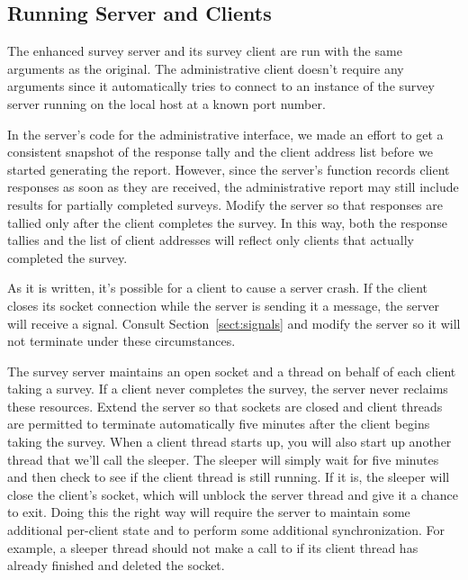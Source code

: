 
\subsection{Running Server and Clients}

The enhanced survey server and its survey client are run with the same
arguments as the original.  The administrative client doesn't require
any arguments since it automatically tries to connect to an instance
of the survey server running on the local host at a known port number.

\begin{exercises}

\item In the server's code for the administrative interface, we made
  an effort to get a consistent snapshot of the response tally and the
  client address list before we started generating the report.
  However, since the server's  function
  records client responses as soon as they are received, the
  administrative report may still include results for
  partially completed surveys.  Modify the server so that responses
  are tallied only after the client completes the survey.  In this
  way, both the response tallies and the list of client addresses will
  reflect only clients that actually completed the survey.

\item As it is written, it's possible for a client to cause a server
  crash.  If the client closes its socket connection while the server
  is sending it a message, the server will receive a 
  signal.  Consult Section~\ref{sect:signals} and modify the server so
  it will not terminate under these circumstances.

\item The survey server maintains an open socket and a thread on behalf
  of each client taking a survey.  If a client never completes the
  survey, the server never reclaims these resources.  Extend the
  server so that sockets are closed and client threads are permitted
  to terminate automatically five minutes after the client begins
  taking the survey.  When a client thread starts up, you will also
  start up another thread that we'll call the sleeper.  The sleeper
  will simply wait for five minutes and then check to see if the
  client thread is still running.  If it is, the sleeper will close
  the client's socket, which will unblock the server thread and give
  it a chance to exit.  Doing this the right way will require the server to
  maintain some additional per-client state and to perform
  some additional synchronization.  For example, a sleeper thread
  should not make a call to  if its client thread has
  already finished and deleted the socket.

\end{exercises}


